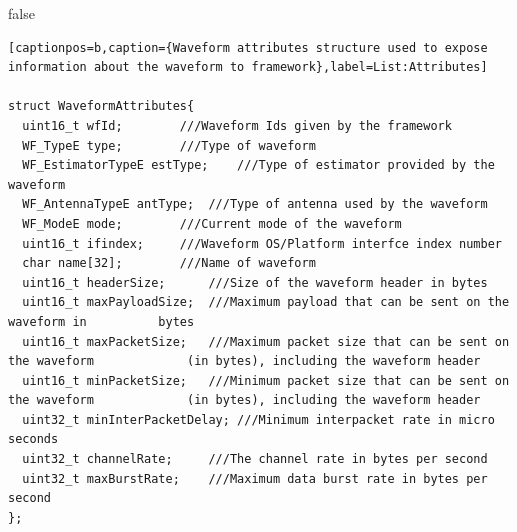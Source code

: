 \if false
\begin{lstlisting}[style=boralargefile][captionpos=b,caption={Waveform attributes structure used to expose information about the waveform to framework},label=List:Attributes]
 
struct WaveformAttributes{
  uint16_t wfId;		///Waveform Ids given by the framework
  WF_TypeE type;		///Type of waveform	
  WF_EstimatorTypeE estType;	///Type of estimator provided by the waveform
  WF_AntennaTypeE antType;	///Type of antenna used by the waveform
  WF_ModeE mode;		///Current mode of the waveform
  uint16_t ifindex;		///Waveform OS/Platform interfce index number
  char name[32];		///Name of waveform
  uint16_t headerSize;		///Size of the waveform header in bytes
  uint16_t maxPayloadSize;	///Maximum payload that can be sent on the waveform in 			bytes
  uint16_t maxPacketSize;	///Maximum packet size that can be sent on the waveform 			(in bytes), including the waveform header
  uint16_t minPacketSize;	///Minimum packet size that can be sent on the waveform 			(in bytes), including the waveform header
  uint32_t minInterPacketDelay; ///Minimum interpacket rate in micro seconds
  uint32_t channelRate; 	///The channel rate in bytes per second
  uint32_t maxBurstRate; 	///Maximum data burst rate in bytes per second
};
\end{lstlisting}

\fi

%


%
